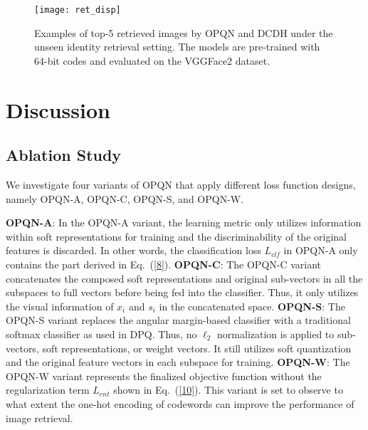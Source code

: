 \documentclass{elsarticle}
\begin{document}
\begin{figure}[htbp]
	\centering
	\texttt{[image: ret\_disp]}
	\caption{Examples of top-5 retrieved images by OPQN and DCDH under the unseen identity retrieval setting. The models are pre-trained with 64-bit codes and evaluated on the VGGFace2 dataset.}
	\label{exp_ret}
\end{figure}


\section{Discussion}\label{sec:5}
\subsection{Ablation Study}
We investigate four variants of OPQN that apply different loss function designs, namely OPQN-A, OPQN-C, OPQN-S, and OPQN-W.

\textbf{OPQN-A}: In the OPQN-A variant, the learning metric only utilizes information within soft representations for training and the discriminability of the original features is discarded. In other words, the classification loss $L_{clf}$ in OPQN-A only contains the part derived in Eq.~(\ref{8}).  \textbf{OPQN-C}: The OPQN-C variant concatenates the composed soft representations and original sub-vectors in all the subspaces to full vectors before being fed into the classifier. 
Thus, it only utilizes the visual information of $x_i$ and $s_i$ in the concatenated space. \textbf{OPQN-S}: The OPQN-S variant replaces the angular margin-based classifier with a traditional softmax classifier as used in DPQ. Thus, no $\ell_2$ normalization is applied to sub-vectors, soft representations, or weight vectors. It still utilizes soft quantization and the original feature vectors in each subspace for training. \textbf{OPQN-W}: The OPQN-W variant represents the finalized objective function without the regularization term $L_{ent}$ shown in Eq.~(\ref{10}). This variant is set to observe to what extent the one-hot encoding of codewords can improve the performance of image retrieval.
\end{document}
